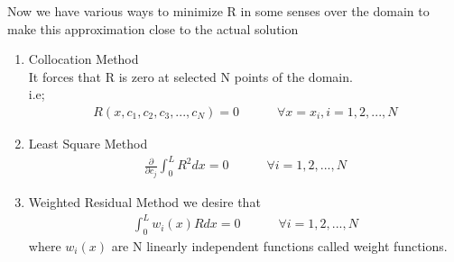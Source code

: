 Now we have various ways to minimize R in some senses over the domain to make this approximation close to the actual solution\\
\begin{enumerate}
	\item Collocation Method\\
	It forces that R is zero at selected N points of the domain.\\
	i.e; 
	\begin{eqnarray}
		R(x,c_1, c_2, c_3,...,c_N) = 0  \quad\quad\quad \forall x=x_i, i = 1,2,...,N
	\end{eqnarray}

	\item Least Square Method
		\begin{eqnarray}
			\frac{\partial}{\partial c_j} \int_{0}^{L} R^2 dx = 0 \quad\quad\quad \forall i = 1,2,...,N
		\end{eqnarray}
	
	\item Weighted Residual Method
		we desire that 
			\begin{eqnarray}
				\int_{0}^{L} w_i(x) R dx = 0 \quad\quad\quad \forall i = 1,2,...,N
			\end{eqnarray}
		where $w_i(x)$ are N linearly independent functions called weight functions.
\end{enumerate}

